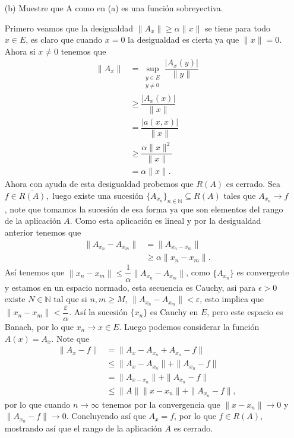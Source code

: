 \begin{itemize}
\begin{sproof}
    \end{sproof}
    \item[(b)] Muestre que A como en (a) es una función sobreyectiva.
    \begin{sproof}
      Primero veamos que la desigualdad $\|A_x\|\geq \alpha\|x\|$ se tiene para todo $x\in E$, es claro que cuando $x=0$ la desigualdad es cierta ya que $\|x\|=0$. Ahora si $x\neq 0$ tenemos que
      \begin{align*}
        \|A_x\|&=\sup_{\substack{y\in E\\y\neq 0}}\dfrac{|A_x(y)|}{\|y\|}\\
        &\geq \dfrac{|A_x(x)|}{\|x\|}\\
        &= \dfrac{|a(x,x)|}{\|x\|}\\
        &\geq \dfrac{\alpha\|x\|^2}{\|x\|}\\
        &=\alpha\|x\|.
      \end{align*}
       Ahora con ayuda de esta desigualdad probemos que $R(A)$ es cerrado. Sea $f\in\overline{R(A)},$ luego existe una sucesión $\{A_{x_n}\}_{n\in\mathbb{N}}\subseteq R(A)$ tales que $A_{x_n}\to f$, note que tomamos la sucesión de esa forma ya que son elementos del rango de la aplicación $A.$ Como esta aplicación es lineal y por la desigualdad anterior tenemos que
       \begin{align*}
         \|A_{x_n}-A_{x_m}\|&=\|A_{x_n-x_m}\|\\
         &\geq \alpha\|x_n-x_m\|.
       \end{align*}
       Así tenemos que $\|x_n-x_m\|\leq\dfrac{1}{\alpha}\|A_{x_n}-A_{x_m}\|$, como $\{A_{x_n}\}$ es convergente y estamos en un espacio normado, esta secuencia es Cauchy, asi para $\epsilon>0$ existe $N\in \mathbb{N}$ tal que si $n,m\geq M$, $\|A_{x_n}-A_{x_m}\|<\varepsilon$, esto implica que $\|x_n-x_m\|<\dfrac{\varepsilon}{\alpha}$. Así la sucesión $\{x_n\}$ es Cauchy en $E$, pero este espacio es Banach, por lo que $x_n\to x\in E $. Luego podemos considerar la función $A(x)=A_x.$ Note que
       \begin{align*}
         \|A_x-f\|&=\|A_x-A_{x_n}+A_{x_n}-f\|\\
         &\leq \|A_x-A_{x_n}\|+\|A_{x_n}-f\|\\
         &=\|A_{x-x_n}\|+\|A_{x_n}-f\|\\
         &\leq\|A\|\|x-x_n\|+\|A_{x_n}-f\|,
       \end{align*}
       por lo que cuando $n\to\infty$ tenemos por la convergencia que $\|x-x_n\|\to 0$ y $\|A_{x_n}-f\|\to 0$. Concluyendo así que $A_x=f$, por lo que $f\in R(A)$, mostrando así que el rango de la aplicación $A$ es cerrado.


\end{sproof}
\end{itemize}
